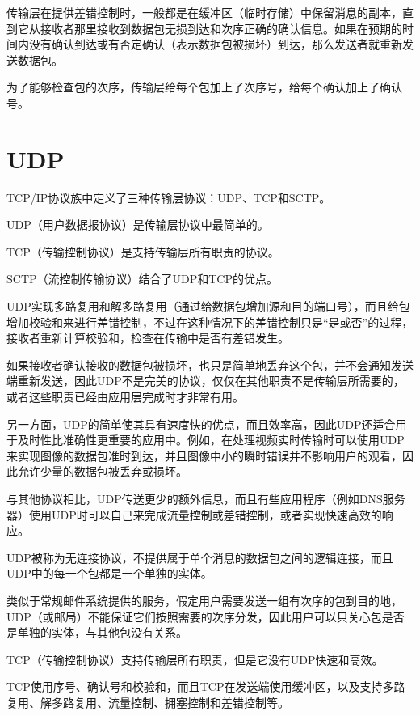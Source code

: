 传输层在提供差错控制时，一般都是在缓冲区（临时存储）中保留消息的副本，直到它从接收者那里接收到数据包无损到达和次序正确的确认信息。如果在预期的时间内没有确认到达或有否定确认（表示数据包被损坏）到达，那么发送者就重新发送数据包。

为了能够检查包的次序，传输层给每个包加上了次序号，给每个确认加上了确认号。


\section{UDP}


TCP/IP协议族中定义了三种传输层协议：UDP、TCP和SCTP。

\begin{compactitem}
\item UDP（用户数据报协议）是传输层协议中最简单的。
\item TCP（传输控制协议）是支持传输层所有职责的协议。
\item SCTP（流控制传输协议）结合了UDP和TCP的优点。
\end{compactitem}




UDP实现多路复用和解多路复用（通过给数据包增加源和目的端口号），而且给包增加校验和来进行差错控制，不过在这种情况下的差错控制只是“是或否”的过程，接收者重新计算校验和，检查在传输中是否有差错发生。

如果接收者确认接收的数据包被损坏，也只是简单地丢弃这个包，并不会通知发送端重新发送，因此UDP不是完美的协议，仅仅在其他职责不是传输层所需要的，或者这些职责已经由应用层完成时才非常有用。

另一方面，UDP的简单使其具有速度快的优点，而且效率高，因此UDP还适合用于及时性比准确性更重要的应用中。例如，在处理视频实时传输时可以使用UDP来实现图像的数据包准时到达，并且图像中小的瞬时错误并不影响用户的观看，因此允许少量的数据包被丢弃或损坏。

与其他协议相比，UDP传送更少的额外信息，而且有些应用程序（例如DNS服务器）使用UDP时可以自己来完成流量控制或差错控制，或者实现快速高效的响应。

UDP被称为无连接协议，不提供属于单个消息的数据包之间的逻辑连接，而且UDP中的每一个包都是一个单独的实体。

类似于常规邮件系统提供的服务，假定用户需要发送一组有次序的包到目的地，UDP（或邮局）不能保证它们按照需要的次序分发，因此用户可以只关心包是否是单独的实体，与其他包没有关系。

TCP（传输控制协议）支持传输层所有职责，但是它没有UDP快速和高效。

TCP使用序号、确认号和校验和，而且TCP在发送端使用缓冲区，以及支持多路复用、解多路复用、流量控制、拥塞控制和差错控制等。

